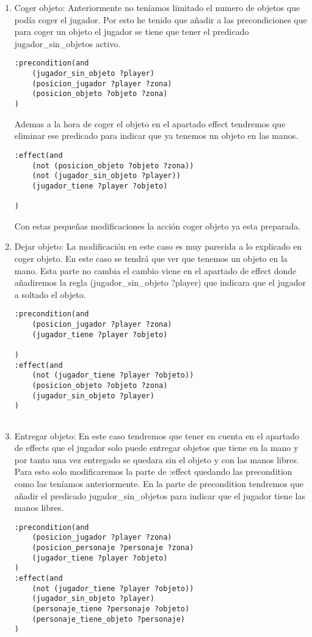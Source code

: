 \documentclass[]{article}
\begin{document}
\begin{enumerate}
	\item{Coger objeto:} Anteriormente no teníamos limitado el numero de objetos que podía coger el jugador. Por esto he tenido que añadir a las precondiciones que para coger un objeto el jugador se tiene que tener el predicado jugador\_sin\_objetos activo. 
	
	\begin{lstlisting}
:precondition(and			
	(jugador_sin_objeto ?player)
	(posicion_jugador ?player ?zona)
	(posicion_objeto ?objeto ?zona)
)
	\end{lstlisting}
	
	Ademas a la hora de coger el objeto en el apartado effect tendremos que eliminar ese predicado para indicar que ya tenemos un objeto en las manos.
	
	\begin{lstlisting}
:effect(and 
	(not (posicion_objeto ?objeto ?zona))
	(not (jugador_sin_objeto ?player))
	(jugador_tiene ?player ?objeto)
	
)
	\end{lstlisting}
	Con estas pequeñas modificaciones la acción coger objeto ya esta preparada.
	
	\item{Dejar objeto:} La modificación en este caso es muy parecida a lo explicado en coger objeto. En este caso se tendrá que ver que tenemos un objeto en la mano. Esta parte no cambia el cambio viene en el apartado de effect donde añadiremos la regla (jugador\_sin\_objeto ?player) que indicara que el jugador a soltado el objeto.
	
	
	
	\begin{lstlisting}
:precondition(and
	(posicion_jugador ?player ?zona)
	(jugador_tiene ?player ?objeto)
	
)
:effect(and 
	(not (jugador_tiene ?player ?objeto))
	(posicion_objeto ?objeto ?zona)
	(jugador_sin_objeto ?player)
)
	

	\end{lstlisting}
\item{Entregar objeto:} En este caso tendremos que tener en cuenta en el apartado de effects que el jugador solo puede entregar objetos que tiene en la mano y por tanto una vez entregado se quedara sin el objeto y con las manos libres. Para esto solo modificaremos la parte de :effect quedando las precondition como las teníamos anteriormente. En la parte de precondition tendremos que añadir el predicado jugador\_sin\_objetos para indicar que el jugador tiene las manos libres.


	\begin{lstlisting}
:precondition(and
	(posicion_jugador ?player ?zona)
	(posicion_personaje ?personaje ?zona)
	(jugador_tiene ?player ?objeto)
)
:effect(and 
	(not (jugador_tiene ?player ?objeto))
	(jugador_sin_objeto ?player)
	(personaje_tiene ?personaje ?objeto)
	(personaje_tiene_objeto ?personaje)
)
	\end{lstlisting}
	
\end{enumerate}	
\end{document}
